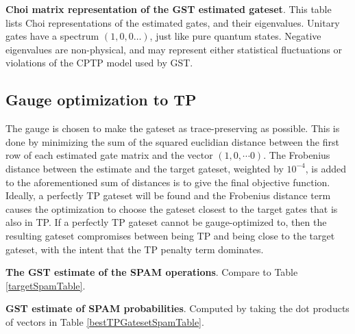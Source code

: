 {\begin{table}[h]
\begin{center}
\caption{\textbf{Choi matrix representation of the GST estimated gateset}.  This table lists Choi representations of the estimated gates, and their eigenvalues.  Unitary gates have a spectrum $(1,0,0\ldots)$, just like pure quantum states.  Negative eigenvalues are non-physical, and may represent either statistical fluctuations or violations of the CPTP model used by GST.\label{bestTargetGatesGatesetChoiTable}}
\end{center}
\end{table}

\clearpage

\subsection{Gauge optimization to TP}
The gauge is chosen to make the gateset as trace-preserving as possible.  This is done by minimizing the sum of the squared euclidian distance between the first row of each estimated gate matrix and the vector $(1,0,\cdots 0)$.  The Frobenius distance between the estimate and the target gateset, weighted by $10^{-4}$, is added to the aforementioned sum of distances is to give the final objective function.  Ideally, a perfectly TP gateset will be found and the Frobenius distance term causes the optimization to choose the gateset closest to the target gates that is also in TP.  If a perfectly TP gateset cannot be gauge-optimized to, then the resulting gateset compromises between being TP and being close to the target gateset, with the intent that the TP penalty term dominates.

\begin{table}[h]
\begin{center}
\caption{\textbf{The GST estimate of the SPAM operations}.  Compare to Table \ref{targetSpamTable}.\label{bestTPGatesetSpamTable}}
\end{center}
\end{table}

\begin{table}[h]
\begin{center}
\caption{\textbf{GST estimate of SPAM probabilities}.  Computed by taking the dot products of vectors in Table \ref{bestTPGatesetSpamTable}.\label{bestTPGatesetSpamParametersTable}}
\end{center}
\end{table}

}
